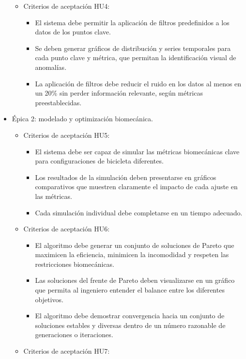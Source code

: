 \documentclass[
11pt, %
]{charter}
\begin{document}
\begin{itemize}
\begin{itemize}
\begin{itemize}
        \end{itemize}
      \item Criterios de aceptación HU4:
        \begin{itemize}
          \item El sistema debe permitir la aplicación de filtros predefinidos a los datos de los puntos clave.
          \item Se deben generar gráficos de distribución y series temporales para cada punto clave y métrica, que permitan la identificación visual de anomalías.
          \item La aplicación de filtros debe reducir el ruido en los datos al menos en un 20\% sin perder información relevante, según métricas preestablecidas.
        \end{itemize}
    \end{itemize}
  \item Épica 2: modelado y optimización biomecánica.
    \begin{itemize}
      \item Criterios de aceptación HU5:
        \begin{itemize}
          \item El sistema debe ser capaz de simular las métricas biomecánicas clave para configuraciones de bicicleta diferentes.
          \item Los resultados de la simulación deben presentarse en gráficos comparativos que muestren claramente el impacto de cada ajuste en las métricas.
          \item Cada simulación individual debe completarse en un tiempo adecuado.
        \end{itemize}
      \item Criterios de aceptación HU6:
        \begin{itemize}
          \item El algoritmo debe generar un conjunto de soluciones de Pareto que maximicen la eficiencia, minimicen la incomodidad y respeten las restricciones biomecánicas.
          \item Las soluciones del frente de Pareto deben visualizarse en un gráfico que permita al ingeniero entender el balance entre los diferentes objetivos.
          \item El algoritmo debe demostrar convergencia hacia un conjunto de soluciones estables y diversas dentro de un número razonable de generaciones o iteraciones.
        \end{itemize}
      \item Criterios de aceptación HU7:

\end{itemize}
\end{itemize}
\end{document}
